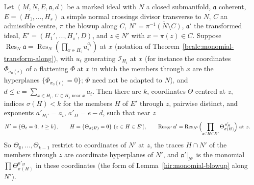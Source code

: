 \begin{corollary}
\label{bcalc:monomial-transform-along-coords}
\leanok
Let \((M,N,E,\mathfrak a,d)\) be a marked ideal with \(N\) a closed submanifold, \(\mathfrak a\) coherent, \(E=(H_1,\dots,H_s)\) a simple normal crossings
divisor transverse to \(N\), \(C\) an admissible centre, \(\pi\) the blowup along \(C\), \(N'=\overline{\pi^{-1}(N\setminus C)}\), \(\mathfrak a'\) the
transformed ideal, \(E'=(H_1',\dots,H_s',D)\), and \(z\in N'\) with \(x=\pi(z)\in C\). Suppose
\(\operatorname{Res}_N\mathfrak a=\operatorname{Res}_N(\prod_{x\in H_i}u_i^{a_i})\) at \(x\) (notation of Theorem~\ref{bcalc:monomial-transform-along}), with \(u_i\)
generating \(\mathcal I_{H_i}\) at \(x\) (for instance the coordinates \(\Phi_{\sigma_0(i)}\) of a flattening \(\Phi\) at \(x\) in which the members through \(x\)
are the hyperplanes \(\{\Phi_{\sigma_0(i)}=0\}\); \(\Phi\) need not be adapted to \(N\)), and \(d\le e=\sum_{x\in H_i,\ C\subset H_i\text{ near }x}a_i\). Then there
are \(k\), coordinates \(\Theta\) centred at \(z\), indices \(\sigma(H)<k\) for the members \(H\) of \(E'\) through \(z\), pairwise distinct, and exponents
\(a'_{H_i'}=a_i\), \(a'_D=e-d\), such that near \(z\)
\[
 N'=\{\Theta_t=0,\ t\ge k\},\qquad H=\{\Theta_{\sigma(H)}=0\}\ (z\in H\in E'),\qquad
 \operatorname{Res}_{N'}\mathfrak a'=\operatorname{Res}_{N'}\Bigl(\prod_{z\in H\in E'}\Theta_{\sigma(H)}^{\,a'_H}\Bigr)\ \text{at }z .
\]
So \(\Theta_0,\dots,\Theta_{k-1}\) restrict to coordinates of \(N'\) at \(z\), the traces \(H\cap N'\) of the members through \(z\) are coordinate hyperplanes
of \(N'\), and \(\mathfrak a'|_{N'}\) is the monomial \(\prod\Theta_{\sigma(H)}^{a'_H}\) in these coordinates (the form of Lemma~\ref{hir:monomial-blowup} along \(N'\)).
\end{corollary}
